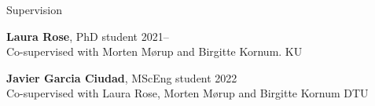 \begin{rSection}{Supervision}
	
	{\bf Laura Rose}, PhD student \hfill {2021--} \\
	Co-supervised with Morten Mørup and Birgitte Kornum. \hfill{KU}

	{\bf Javier Garcia Ciudad}, MScEng student \hfill {2022} \\
	Co-supervised with Laura Rose, Morten Mørup and Birgitte Kornum \hfill {DTU}
	
	
	
	

\end{rSection}

